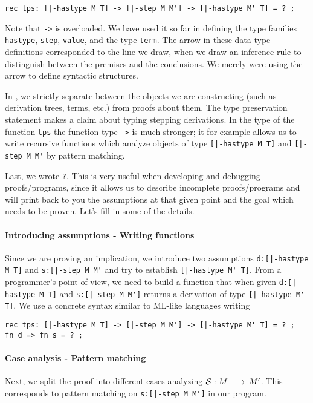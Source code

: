 \begin{lstlisting}
rec tps: [|-hastype M T] -> [|-step M M'] -> [|-hastype M' T] = ? ;
\end{lstlisting}

Note that \lstinline!->! is overloaded. We have used it so far in defining
the type families \lstinline!hastype!, \lstinline!step!,
\lstinline!value!, and the type \lstinline!term!. The arrow in these
data-type definitions corresponded to the line we draw, when we draw an
inference rule to distinguish between the premises and the
conclusions. We merely were using the arrow to define syntactic
structures.

In \beluga, we strictly separate between the objects we are
constructing (such as derivation trees, terms, etc.) from proofs about
them. The type preservation statement makes a claim about typing
stepping derivations. In the type of the function \lstinline!tps! the
function type \lstinline!->! is much stronger; it for example allows us to write
recursive functions which analyze objects of type \lstinline![|-hastype M T]! and
\lstinline![|-step M M'! by pattern matching.

Last, we wrote \lstinline!?!. This is very useful when developing and
debugging proofs/programs, since it allows us to describe incomplete
proofs/programs and \beluga will print back to you the assumptions at
that given point and the goal which needs to be proven.
Let's fill in some of the details.

\paragraph{Introducing assumptions - Writing functions} Since we are proving an
implication, we introduce two assumptions \lstinline!d:[|-hastype M T]! and
\lstinline!s:[|-step M M'! and try to establish
\lstinline![|-hastype M' T]!. From a programmer's point of view, we need
to build a function that when given \lstinline!d:[|-hastype M T]! and
\lstinline!s:[|-step M M']! returns a derivation of type
\lstinline![|-hastype M' T]!. We use a concrete syntax similar to
ML-like languages writing

\begin{lstlisting}
rec tps: [|-hastype M T] -> [|-step M M'] -> [|-hastype M' T] = ? ;
fn d => fn s = ? ;
\end{lstlisting}


\paragraph{Case analysis - Pattern matching} Next, we split the proof
into different cases analyzing ${\mathcal{S}} : M \mathrel{\,\longrightarrow\,} M'$. This corresponds
to pattern matching on \lstinline!s:[|-step M M']! in our program.

